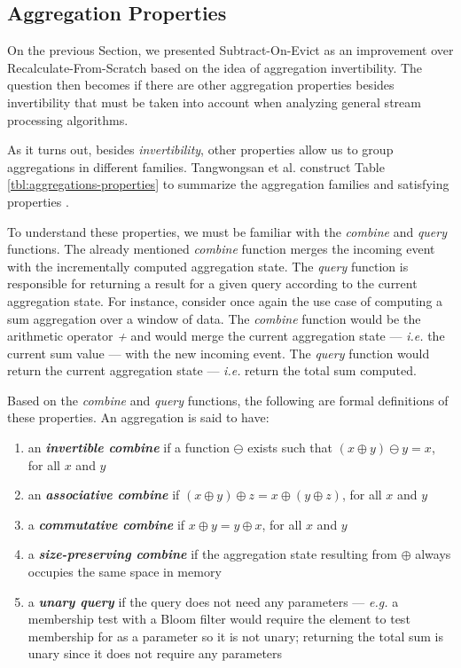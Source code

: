 \subsection{Aggregation Properties}
\label{sec:agg-properties}

On the previous Section, we presented Subtract-On-Evict as an improvement over Recalculate-From-Scratch based on the idea of aggregation invertibility. The question then becomes if there are other aggregation properties besides invertibility that must be taken into account when analyzing general stream processing algorithms.

As it turns out, besides \textit{invertibility}, other properties allow us to group aggregations in different families. Tangwongsan et al. construct Table \ref{tbl:aggregations-properties} to summarize the aggregation families and satisfying properties \cite{Tangwongsan-Sliding-Window-Aggregation-Algorithms}.

To understand these properties, we must be familiar with the \textit{combine} and \textit{query} functions. The already mentioned \textit{combine} function merges the incoming event with the incrementally computed aggregation state. The \textit{query} function is responsible for returning a result for a given query according to the current aggregation state. For instance, consider once again the use case of computing a sum aggregation over a window of data. The \textit{combine} function would be the arithmetic operator \textit{+} and would merge the current aggregation state --- \textit{i.e.} the current sum value --- with the new incoming event. The \textit{query} function would return the current aggregation state --- \textit{i.e.} return the total sum computed.


Based on the \textit{combine} and \textit{query} functions, the following are formal definitions of these properties. An aggregation is said to have:

\begin{enumerate}
    \item  an \textbf{\textit{invertible combine}} if a function $\ominus$ exists such that $(x \oplus y) \ominus y = x$, for all $x$ and $y$
    
    \item  an \textbf{\textit{associative combine}} if $(x \oplus y) \oplus z = x \oplus (y \oplus z)$, for all $x$ and $y$
    
    \item  a \textbf{\textit{commutative combine}} if $x \oplus y = y \oplus x$, for all $x$ and $y$
    
    \item  a \textbf{\textit{size-preserving combine}} if the aggregation state resulting from $\oplus$ always occupies the same space in memory
   
    \item  a \textbf{\textit{unary query}} if the query does not need any parameters --- \textit{e.g.} a membership test with a Bloom filter would require the element to test membership for as a parameter so it is not unary; returning the total sum is unary since it does not require any parameters
\end{enumerate}

